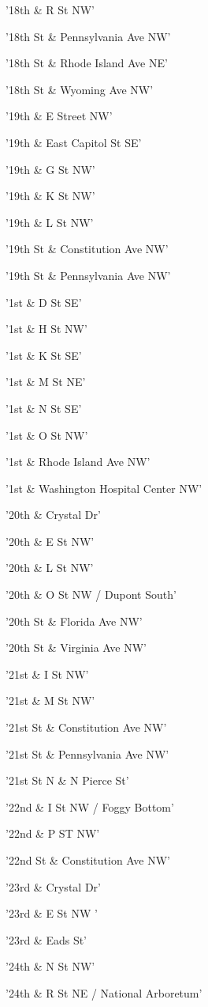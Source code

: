 \documentclass[11pt]{article}
\begin{document}
\begin{enumerate*}
\item '18th \& R St NW'
\item '18th St \& Pennsylvania Ave NW'
\item '18th St \& Rhode Island Ave NE'
\item '18th St \& Wyoming Ave NW'
\item '19th \& E Street NW'
\item '19th \& East Capitol St SE'
\item '19th \& G St NW'
\item '19th \& K St NW'
\item '19th \& L St NW'
\item '19th St \& Constitution Ave NW'
\item '19th St \& Pennsylvania Ave NW'
\item '1st \& D St SE'
\item '1st \& H St NW'
\item '1st \& K St SE'
\item '1st \& M St NE'
\item '1st \& N St  SE'
\item '1st \& O St NW'
\item '1st \& Rhode Island Ave NW'
\item '1st \& Washington Hospital Center NW'
\item '20th \& Crystal Dr'
\item '20th \& E St NW'
\item '20th \& L St NW'
\item '20th \& O St NW / Dupont South'
\item '20th St \& Florida Ave NW'
\item '20th St \& Virginia Ave NW'
\item '21st \& I St NW'
\item '21st \& M St NW'
\item '21st St \& Constitution Ave NW'
\item '21st St \& Pennsylvania Ave NW'
\item '21st St N \& N Pierce St'
\item '22nd \& I St NW / Foggy Bottom'
\item '22nd \& P ST NW'
\item '22nd St \& Constitution Ave NW'
\item '23rd \& Crystal Dr'
\item '23rd \& E St NW '
\item '23rd \& Eads St'
\item '24th \& N St NW'
\item '24th \& R St NE / National Arboretum'

\end{enumerate*}
\end{document}
